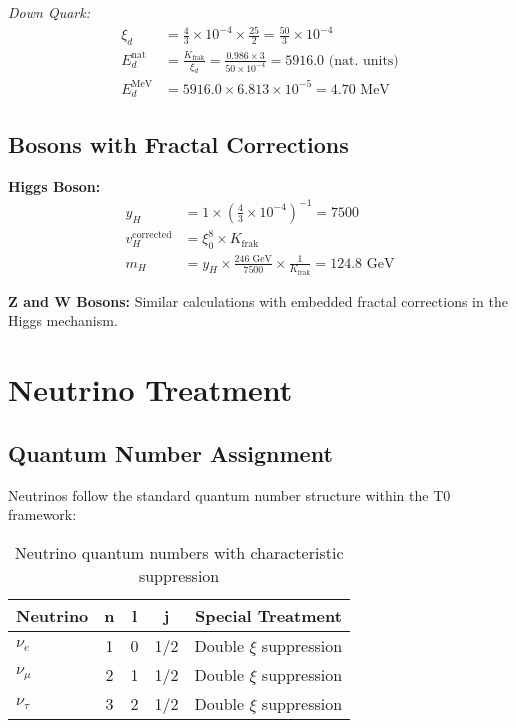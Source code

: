 \documentclass[12pt,a4paper]{article}
\begin{document}
\textit{Down Quark:}
\begin{align}
	\xi_d &= \frac{4}{3} \times 10^{-4} \times \frac{25}{2} = \frac{50}{3} \times 10^{-4} \\
	E_d^{\text{nat}} &= \frac{K_{\text{frak}}}{\xi_d} = \frac{0.986 \times 3}{50 \times 10^{-4}} 
	= 5916.0 \text{ (nat. units)} \\
	E_d^{\text{MeV}} &= 5916.0 \times 6.813 \times 10^{-5} = 4.70 \text{ MeV}
\end{align}

\subsection{Bosons with Fractal Corrections}
\label{subsec:bosons_enhanced}

\textbf{Higgs Boson:}
\begin{align}
	y_H &= 1 \times \left(\frac{4}{3} \times 10^{-4}\right)^{-1} = 7500 \\
	v_H^{\text{corrected}} &= \xi_0^8 \times K_{\text{frak}} \\
	m_H &= y_H \times \frac{246 \text{ GeV}}{7500} \times \frac{1}{K_{\text{frak}}} = 124.8 \text{ GeV}
\end{align}

\textbf{Z and W Bosons:} Similar calculations with embedded fractal corrections in the Higgs mechanism.

	\section{Neutrino Treatment}
	\label{sec:neutrino_treatment}
	
	\subsection{Quantum Number Assignment}
	\label{subsec:neutrino_quantum_numbers}
	
	Neutrinos follow the standard quantum number structure within the T0 framework:
	
	\begin{table}[H]
		\centering
		\begin{tabular}{lcccc}
			\toprule
			\textbf{Neutrino} & \textbf{n} & \textbf{l} & \textbf{j} & \textbf{Special Treatment} \\
			\midrule
			$\nu_e$ & 1 & 0 & 1/2 & Double $\xi$ suppression \\
			$\nu_\mu$ & 2 & 1 & 1/2 & Double $\xi$ suppression \\
			$\nu_\tau$ & 3 & 2 & 1/2 & Double $\xi$ suppression \\
			\bottomrule
		\end{tabular}
		\caption{Neutrino quantum numbers with characteristic suppression}
		\label{tab:neutrino_quantum_numbers}
	\end{table}
	
\end{document}
